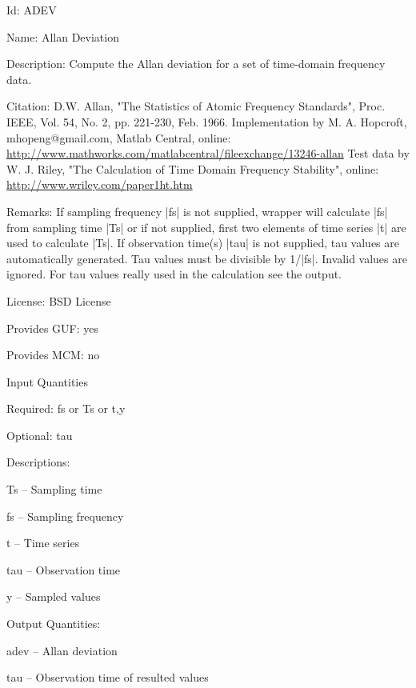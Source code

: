 \begin{tightdesc}
\item [Id:] ADEV
\item [Name:] Allan Deviation
\item [Description:] Compute the Allan deviation for a set of time-domain frequency data.
\item [Citation:] D.W. Allan, "The Statistics of Atomic Frequency Standards", Proc. IEEE, Vol. 54, No. 2, pp. 221-230, Feb. 1966. Implementation by M. A. Hopcroft, mhopeng@gmail.com, Matlab Central, online: \url{http://www.mathworks.com/matlabcentral/fileexchange/13246-allan} Test data by W. J. Riley, "The Calculation of Time Domain Frequency Stability", online: \url{http://www.wriley.com/paper1ht.htm}
\item [Remarks:] If sampling frequency |fs| is not supplied, wrapper will calculate |fs| from sampling time |Ts| or if not supplied, first two elements of time series |t| are used to calculate |Ts|. If observation time(s) |tau| is not supplied, tau values are automatically generated. Tau values must be divisible by 1/|fs|. Invalid values are ignored. For tau values really used in the calculation see the output.
\item [License:] BSD License
\item [Provides GUF:] yes
\item [Provides MCM:] no
\item [Input Quantities] \rule{0em}{0em}
    \begin{tightdesc}
    \item [Required:] 
        \textsf{fs} or \textsf{Ts} or \textsf{t},\enspace \textsf{y}
    \item [Optional:] 
        \textsf{tau}
    \item [Descriptions:] \rule{0em}{0em}
        \begin{tightdesc}
            \item[\textsf{Ts}] -- Sampling time
            \item[\textsf{fs}] -- Sampling frequency
            \item[\textsf{t}] -- Time series
            \item[\textsf{tau}] -- Observation time
            \item[\textsf{y}] -- Sampled values
        \end{tightdesc}
    \end{tightdesc}
\item [Output Quantities:] \rule{0em}{0em}
    \begin{tightdesc}
        \item[\textsf{adev}] -- Allan deviation
        \item[\textsf{tau}] -- Observation time of resulted values
    \end{tightdesc}
\end{tightdesc}
